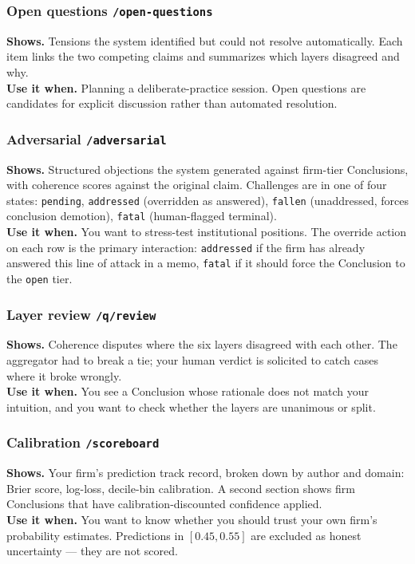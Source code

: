 \documentclass[11pt,letterpaper]{article}
\newcommand{\file}[1]{\texttt{#1}}
\begin{document}
\subsubsection*{Open questions \hfill \file{/open-questions}}
\textbf{Shows.} Tensions the system identified but could not resolve automatically. Each item links the two competing claims and summarizes which layers disagreed and why. \\
\textbf{Use it when.} Planning a deliberate-practice session. Open questions are candidates for explicit discussion rather than automated resolution.

\subsubsection*{Adversarial \hfill \file{/adversarial}}
\textbf{Shows.} Structured objections the system generated against firm-tier Conclusions, with coherence scores against the original claim. Challenges are in one of four states: \texttt{pending}, \texttt{addressed} (overridden as answered), \texttt{fallen} (unaddressed, forces conclusion demotion), \texttt{fatal} (human-flagged terminal). \\
\textbf{Use it when.} You want to stress-test institutional positions. The override action on each row is the primary interaction: \texttt{addressed} if the firm has already answered this line of attack in a memo, \texttt{fatal} if it should force the Conclusion to the \texttt{open} tier.

\subsubsection*{Layer review \hfill \file{/q/review}}
\textbf{Shows.} Coherence disputes where the six layers disagreed with each other. The aggregator had to break a tie; your human verdict is solicited to catch cases where it broke wrongly. \\
\textbf{Use it when.} You see a Conclusion whose rationale does not match your intuition, and you want to check whether the layers are unanimous or split.

\subsubsection*{Calibration \hfill \file{/scoreboard}}
\textbf{Shows.} Your firm's prediction track record, broken down by author and domain: Brier score, log-loss, decile-bin calibration. A second section shows firm Conclusions that have calibration-discounted confidence applied. \\
\textbf{Use it when.} You want to know whether you should trust your own firm's probability estimates. Predictions in $[0.45, 0.55]$ are excluded as honest uncertainty --- they are not scored.
\end{document}
